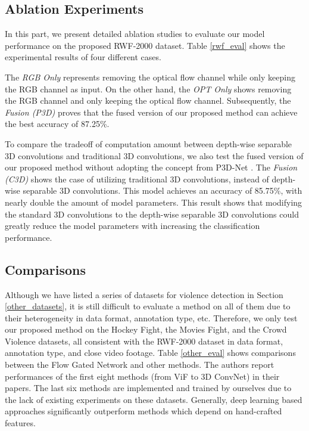 \documentclass[a4paper,conference]{IEEEtran}
\begin{document}
\subsection{Ablation Experiments}
In this part, we present detailed ablation studies to evaluate our model performance on the proposed RWF-2000 dataset. Table \ref{rwf_eval} shows the experimental results of four different cases. 

The \emph{RGB Only} represents removing the optical flow channel while only keeping the RGB channel as input. On the other hand, the \emph{OPT Only} shows removing the RGB channel and only keeping the optical flow channel. Subsequently, the \emph{Fusion (P3D)} proves that the fused version of our proposed method can achieve the best accuracy of 87.25\%.  

To compare the tradeoff of computation amount between depth-wise separable 3D convolutions and traditional 3D convolutions, we also test the fused version of our proposed method without adopting the concept from P3D-Net \cite{p3d}. The \emph{Fusion (C3D)} shows the case of utilizing traditional 3D convolutions, instead of depth-wise separable 3D convolutions. This model achieves an accuracy of 85.75\%, with nearly double the amount of model parameters. This result shows that modifying the standard 3D convolutions to the depth-wise separable 3D convolutions could greatly reduce the model parameters with increasing the classification performance. 



\subsection{Comparisons}
Although we have listed a series of datasets for violence detection in Section \ref{other_datasets}, it is still difficult to evaluate a method on all of them due to their heterogeneity in data format, annotation type, etc. Therefore, we only test our proposed method on the Hockey Fight, the Movies Fight, and the Crowd Violence datasets, all consistent with the RWF-2000 dataset in data format, annotation type, and close video footage. Table \ref{other_eval} shows comparisons between the Flow Gated Network and other methods. The authors report performances of the first eight methods (from ViF to 3D ConvNet) in their papers. The last six methods are implemented and trained by ourselves due to the lack of existing experiments on these datasets. Generally, deep learning based approaches significantly outperform methods which depend on hand-crafted features. 
\end{document}
